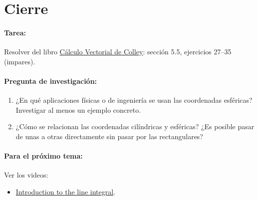 \documentclass[a4,11pt]{aleph-notas}
\begin{document}
\section*{Cierre}

\paragraph{Tarea:}
Resolver del libro \href{https://catalogobiblioteca.puce.edu.ec/cgi-bin/koha/opac-detail.pl?biblionumber=83405&query_desc=su%3A%22An%C3%A1lisis%20vectorial%22}{Cálculo Vectorial de Colley}: sección 5.5, ejercicios 27--35 (impares).

\paragraph{Pregunta de investigación:}
\begin{enumerate}[leftmargin=*]
    \item ¿En qué aplicaciones físicas o de ingeniería se usan las coordenadas esféricas? Investigar al menos un ejemplo concreto.
    \item ¿Cómo se relacionan las coordenadas cilíndricas y esféricas? ¿Es posible pasar de unas a otras directamente sin pasar por las rectangulares?
\end{enumerate}

\paragraph{Para el próximo tema:}
Ver los videos:
\begin{itemize}[leftmargin=*]
    \item \href{https://youtu.be/_60sKaoRmhU?si=ZxPAXnud8_u64IQK}{Introduction to the line integral}.
\end{itemize}
\end{document}
